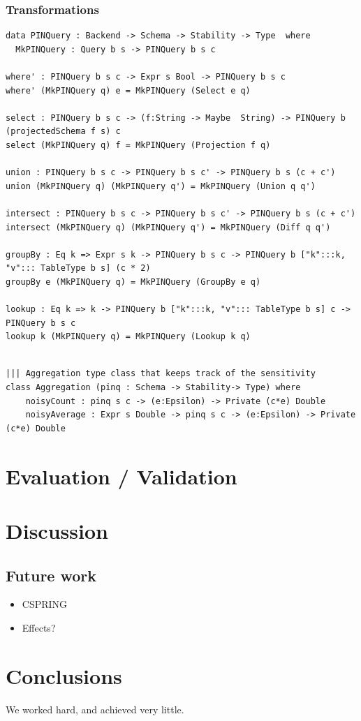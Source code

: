 \documentclass[12pt]{article}
\begin{document}
\subsubsection{Transformations}\label{sec:pinq:transformations}




\begin{lstlisting}[label={lst:pinquery},caption=PINQuery]
data PINQuery : Backend -> Schema -> Stability -> Type  where
  MkPINQuery : Query b s -> PINQuery b s c

where' : PINQuery b s c -> Expr s Bool -> PINQuery b s c
where' (MkPINQuery q) e = MkPINQuery (Select e q)

select : PINQuery b s c -> (f:String -> Maybe  String) -> PINQuery b (projectedSchema f s) c
select (MkPINQuery q) f = MkPINQuery (Projection f q)

union : PINQuery b s c -> PINQuery b s c' -> PINQuery b s (c + c')
union (MkPINQuery q) (MkPINQuery q') = MkPINQuery (Union q q')

intersect : PINQuery b s c -> PINQuery b s c' -> PINQuery b s (c + c')
intersect (MkPINQuery q) (MkPINQuery q') = MkPINQuery (Diff q q')

groupBy : Eq k => Expr s k -> PINQuery b s c -> PINQuery b ["k":::k, "v"::: TableType b s] (c * 2)
groupBy e (MkPINQuery q) = MkPINQuery (GroupBy e q)

lookup : Eq k => k -> PINQuery b ["k":::k, "v"::: TableType b s] c -> PINQuery b s c
lookup k (MkPINQuery q) = MkPINQuery (Lookup k q)

\end{lstlisting}

\begin{lstlisting}[label={lst:aggregation},caption=Aggregation type class]

||| Aggregation type class that keeps track of the sensitivity
class Aggregation (pinq : Schema -> Stability-> Type) where
    noisyCount : pinq s c -> (e:Epsilon) -> Private (c*e) Double
    noisyAverage : Expr s Double -> pinq s c -> (e:Epsilon) -> Private (c*e) Double
\end{lstlisting}

\section{Evaluation / Validation}\label{sec:evaluation}

\section{Discussion}\label{sec:discussion}

\subsection{Future work}\label{sec:future_work}

\begin{itemize}
  \item CSPRING
  \item Effects?
\end{itemize}

\section{Conclusions}\label{sec:conclusions}
We worked hard, and achieved very little.



\end{document}
